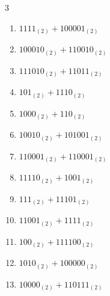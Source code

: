 \begin{multicols}{3}
\begin{enumerate}

  \item $1111_{(2)} + 100001_{(2)}$


  \item $100010_{(2)} + 110010_{(2)}$


  \item $111010_{(2)} + 11011_{(2)}$


  \item $101_{(2)} + 1110_{(2)}$


  \item $1000_{(2)} + 110_{(2)}$


  \item $10010_{(2)} + 101001_{(2)}$


  \item $110001_{(2)} + 110001_{(2)}$


  \item $11110_{(2)} + 1001_{(2)}$


\columnbreak %

  \item $111_{(2)} + 11101_{(2)}$


  \item $11001_{(2)} + 1111_{(2)}$


  \item $100_{(2)} + 111100_{(2)}$


  \item $1010_{(2)} + 100000_{(2)}$


  \item $10000_{(2)} + 110111_{(2)}$



\end{enumerate}
\end{multicols}
